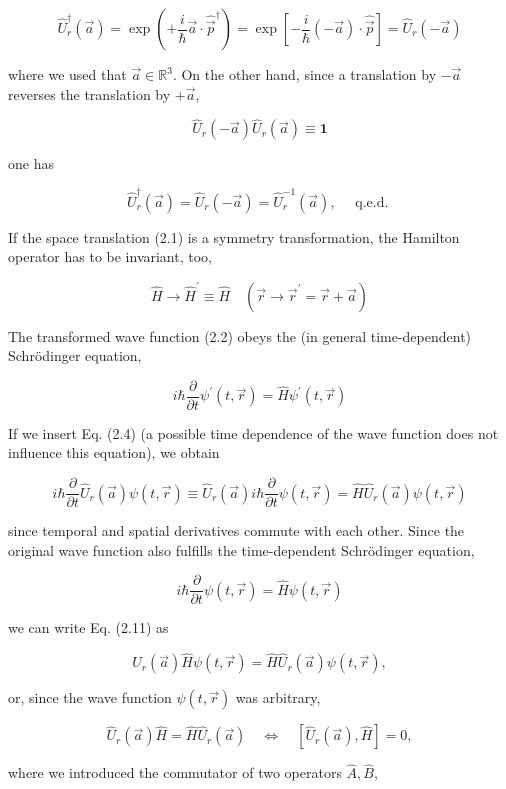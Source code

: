 \documentclass[10pt, letterpaper]{article}
\begin{document}
$$
\hat{U}_{r}^{\dagger}(\vec{a})=\exp \left(+\frac{i}{\hbar} \vec{a} \cdot \hat{\vec{p}}^{\dagger}\right)=\exp \left[-\frac{i}{\hbar}(-\vec{a}) \cdot \hat{\vec{p}}\right]=\hat{U}_{r}(-\vec{a})
$$

where we used that $\vec{a} \in \mathbb{R}^{3}$. On the other hand, since a translation by $-\vec{a}$ reverses the translation by $+\vec{a}$,

$$
\hat{U}_{r}(-\vec{a}) \hat{U}_{r}(\vec{a}) \equiv \mathbf{1}
$$

one has

$$
\hat{U}_{r}^{\dagger}(\vec{a})=\hat{U}_{r}(-\vec{a})=\hat{U}_{r}^{-1}(\vec{a}), \quad \text { q.e.d. }
$$

If the space translation (2.1) is a symmetry transformation, the Hamilton operator has to be invariant, too,

$$
\hat{H} \longrightarrow \hat{H}^{\prime} \equiv \hat{H} \quad\left(\vec{r} \longrightarrow \vec{r}^{\prime}=\vec{r}+\vec{a}\right)
$$

The transformed wave function (2.2) obeys the (in general time-dependent) Schrödinger equation,

$$
i \hbar \frac{\partial}{\partial t} \psi^{\prime}(t, \vec{r})=\hat{H} \psi^{\prime}(t, \vec{r})
$$

If we insert Eq. (2.4) (a possible time dependence of the wave function does not influence this equation), we obtain

$$
i \hbar \frac{\partial}{\partial t} \hat{U}_{r}(\vec{a}) \psi(t, \vec{r}) \equiv \hat{U}_{r}(\vec{a}) i \hbar \frac{\partial}{\partial t} \psi(t, \vec{r})=\hat{H} \hat{U}_{r}(\vec{a}) \psi(t, \vec{r})
$$

since temporal and spatial derivatives commute with each other. Since the original wave function also fulfills the time-dependent Schrödinger equation,

$$
i \hbar \frac{\partial}{\partial t} \psi(t, \vec{r})=\hat{H} \psi(t, \vec{r})
$$

we can write Eq. (2.11) as

$$
\hat{U}_{r}(\vec{a}) \hat{H} \psi(t, \vec{r})=\hat{H} \hat{U}_{r}(\vec{a}) \psi(t, \vec{r}),
$$

or, since the wave function $\psi(t, \vec{r})$ was arbitrary,

$$
\hat{U}_{r}(\vec{a}) \hat{H}=\hat{H} \hat{U}_{r}(\vec{a}) \quad \Longleftrightarrow \quad\left[\hat{U}_{r}(\vec{a}), \hat{H}\right]=0,
$$

where we introduced the commutator of two operators $\hat{A}, \hat{B}$,
\end{document}
